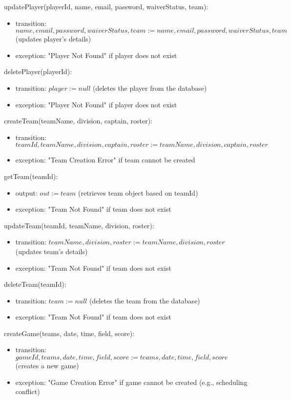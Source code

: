 \documentclass[12pt, titlepage]{article}
\begin{document}
\noindent updatePlayer(playerId, name, email, password, waiverStatus, team):
\begin{itemize}
\item transition: $name, email, password, waiverStatus, team := name, email, password, waiverStatus, team$ (updates player's details)
\item exception: "Player Not Found" if player does not exist
\end{itemize}

\noindent deletePlayer(playerId):
\begin{itemize}
\item transition: $player := null$ (deletes the player from the database)
\item exception: "Player Not Found" if player does not exist
\end{itemize}

\noindent createTeam(teamName, division, captain, roster):
\begin{itemize}
\item transition: $teamId, teamName, division, captain, roster := teamName, division, captain, roster$
\item exception: "Team Creation Error" if team cannot be created
\end{itemize}

\noindent getTeam(teamId):
\begin{itemize}
\item output: $out := team$ (retrieves team object based on teamId)
\item exception: "Team Not Found" if team does not exist
\end{itemize}

\noindent updateTeam(teamId, teamName, division, roster):
\begin{itemize}
\item transition: $teamName, division, roster := teamName, division, roster$ (updates team's details)
\item exception: "Team Not Found" if team does not exist
\end{itemize}

\noindent deleteTeam(teamId):
\begin{itemize}
\item transition: $team := null$ (deletes the team from the database)
\item exception: "Team Not Found" if team does not exist
\end{itemize}

\noindent createGame(teams, date, time, field, score):
\begin{itemize}
\item transition: $gameId, teams, date, time, field, score := teams, date, time, field, score$ (creates a new game)
\item exception: "Game Creation Error" if game cannot be created (e.g., scheduling conflict)
\end{itemize}
\end{document}

